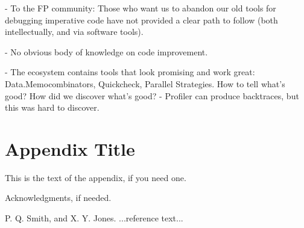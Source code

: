 \documentclass[preprint]{sigplanconf}
\begin{document}
- To the FP community: Those who want us to abandon our old tools for debugging imperative code have not provided a clear path to follow (both intellectually, and via software tools).

- No obvious body of knowledge on code improvement.

- The ecosystem contains tools that look promising and work great: Data.Memocombinators, Quickcheck, Parallel Strategies. How to tell what's good? How did we discover what's good?
- Profiler can produce backtraces, but this was hard to discover.

\appendix
\section{Appendix Title}

This is the text of the appendix, if you need one.

\acks

Acknowledgments, if needed.





\begin{thebibliography}{}
\softraggedright

P. Q. Smith, and X. Y. Jones. ...reference text...

\end{thebibliography}
\end{document}

